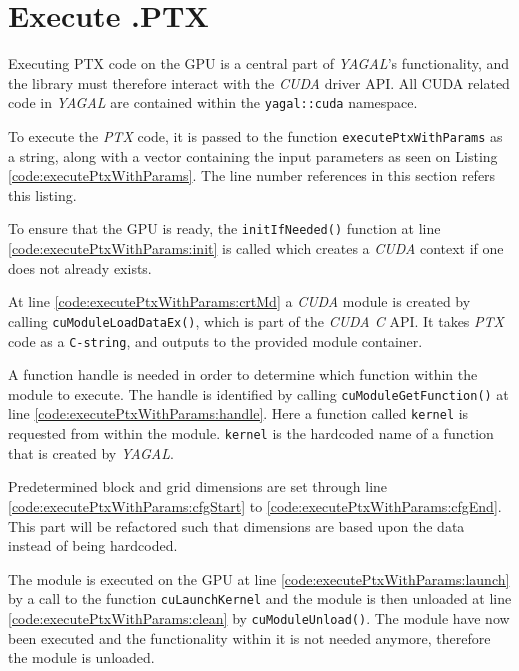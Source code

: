 \section{Execute .PTX} \label{cha:execPtx}
Executing PTX code on the GPU is a central part of \textit{YAGAL}'s functionality, and the library must therefore interact with the \textit{CUDA} driver API. All CUDA related code in \textit{YAGAL} are contained within the \texttt{yagal::cuda} namespace. 

To execute the \textit{PTX} code, it is passed to the function \texttt{executePtxWithParams} as a string, along with a vector containing the input parameters as seen on Listing \ref{code:executePtxWithParams}. The line number references in this section refers this listing.

To ensure that the GPU is ready, the \texttt{initIfNeeded()} function at line \ref{code:executePtxWithParams:init} is called which creates a \textit{CUDA} context if one does not already exists.

At line \ref{code:executePtxWithParams:crtMd} a \textit{CUDA} module is created by calling \texttt{cuModuleLoadDataEx()}, which is part of the \textit{CUDA C} API. It takes \textit{PTX} code as a \texttt{C-string}, and outputs to the provided module container.

A function handle is needed in order to determine which function within the module to execute. The handle is identified by calling \texttt{cuModuleGetFunction()} at line \ref{code:executePtxWithParams:handle}. Here a function called \texttt{kernel} is requested from within the module. \texttt{kernel} is the hardcoded name of a function that is created by \textit{YAGAL}.

Predetermined block and grid dimensions are set through line \ref{code:executePtxWithParams:cfgStart} to \ref{code:executePtxWithParams:cfgEnd}. This part will be refactored such that dimensions are based upon the data instead of being hardcoded.

The module is executed on the GPU at line \ref{code:executePtxWithParams:launch} by a call to the function \texttt{cuLaunchKernel} and the module is then unloaded at line \ref{code:executePtxWithParams:clean} by \texttt{cuModuleUnload()}. The module have now been executed and the functionality within it is not needed anymore, therefore the module is unloaded.

